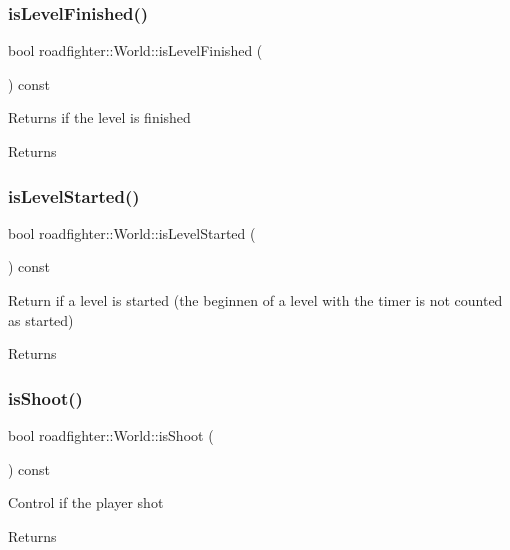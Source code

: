 \subsubsection{\texorpdfstring{is\+Level\+Finished()}{isLevelFinished()}}
{\footnotesize\ttfamily bool roadfighter\+::\+World\+::is\+Level\+Finished (\begin{DoxyParamCaption}{ }\end{DoxyParamCaption}) const}

Returns if the level is finished \begin{DoxyReturn}{Returns}

\end{DoxyReturn}
\mbox{\label{classroadfighter_1_1World_ad166a9c13a6d17efbee871cc3f309885}} 
\subsubsection{\texorpdfstring{is\+Level\+Started()}{isLevelStarted()}}
{\footnotesize\ttfamily bool roadfighter\+::\+World\+::is\+Level\+Started (\begin{DoxyParamCaption}{ }\end{DoxyParamCaption}) const}

Return if a level is started (the beginnen of a level with the timer is not counted as started) \begin{DoxyReturn}{Returns}

\end{DoxyReturn}
\mbox{\label{classroadfighter_1_1World_aa2e7026dfcb854af9484aad37ad4009d}} 
\subsubsection{\texorpdfstring{is\+Shoot()}{isShoot()}}
{\footnotesize\ttfamily bool roadfighter\+::\+World\+::is\+Shoot (\begin{DoxyParamCaption}{ }\end{DoxyParamCaption}) const}

Control if the player shot \begin{DoxyReturn}{Returns}

\end{DoxyReturn}
\mbox{\label{classroadfighter_1_1World_ad2edbd8e41dfbc65c99500512f954940}} 
